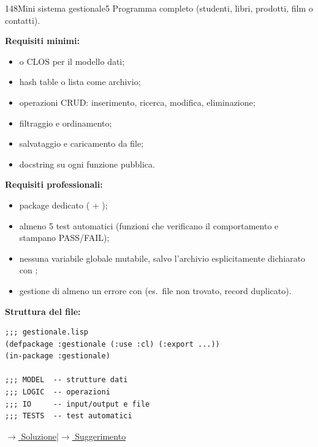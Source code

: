 \label{ex:148}
\begin{stdbox}{148}{Mini sistema gestionale}{5}
Programma completo (studenti, libri, prodotti, film o contatti).

\textbf{Requisiti minimi:}
\begin{itemize}[leftmargin=2em]
  \item {} o CLOS per il modello dati;
  \item hash table o lista come archivio;
  \item operazioni CRUD: inserimento, ricerca, modifica, eliminazione;
  \item filtraggio e ordinamento;
  \item salvataggio e caricamento da file;
  \item docstring su ogni funzione pubblica.
\end{itemize}

\textbf{Requisiti professionali:}
\begin{itemize}[leftmargin=2em]
  \item package dedicato ( + );
  \item almeno 5 test automatici (funzioni  che verificano
        il comportamento e stampano PASS/FAIL);
  \item nessuna variabile globale mutabile, salvo l'archivio
        esplicitamente dichiarato con ;
  \item gestione di almeno un errore con 
        (es.\ file non trovato, record duplicato).
\end{itemize}

\textbf{Struttura del file:}
\begin{lstlisting}
;;; gestionale.lisp
(defpackage :gestionale (:use :cl) (:export ...))
(in-package :gestionale)

;;; MODEL  -- strutture dati
;;; LOGIC  -- operazioni
;;; IO     -- input/output e file
;;; TESTS  -- test automatici
\end{lstlisting}


\small\color{black!55}\hyperref[sol:148]{$\rightarrow$ Soluzione}\enspace\textcolor{black!30}{|}\enspace\hyperref[hint:148]{$\rightarrow$ Suggerimento}\normalsize\color{black}
\end{stdbox}


